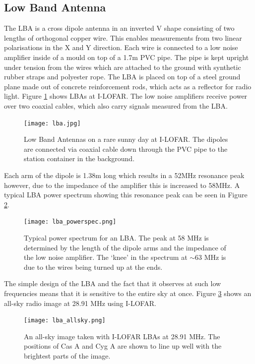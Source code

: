 \subsection{Low Band Antenna}
The LBA is a cross dipole antenna in an inverted V shape consisting of two lengths of orthogonal copper wire. This enables measurements from two linear polarisations in the X and Y direction. Each wire is connected to a low noise amplifier inside of a mould on top of a 1.7m PVC pipe. The pipe is kept upright under tension from the wires which are attached to the ground with synthetic rubber straps and polyester rope. The LBA is placed on top of a steel ground plane made out of concrete reinforcement rods, which acts as a reflector for radio light. Figure \ref{fig:LBA} shows LBAs at I-LOFAR. The low noise amplifiers receive power over two coaxial cables, which also carry signals measured from the LBA.

\begin{figure}
\centering
\texttt{[image: lba.jpg]}
\caption[Low Band Antennas at I-LOFAR]{Low Band Antennas on a rare sunny day at I-LOFAR. The dipoles are connected via coaxial cable down through the PVC pipe to the station container in the background.}
\label{fig:LBA}
\end{figure}

Each arm of the dipole is 1.38m long which results in a 52MHz resonance peak however, due to the impedance of the amplifier this is increased to 58MHz. A typical LBA power spectrum showing this resonance peak can be seen in Figure \ref{fig:LBA_power_spec}.

\begin{figure}
    \centering
    \texttt{[image: lba\_powerspec.png]}
    \caption[Typical power spectrum for an LBA.]{Typical power spectrum for an LBA. The peak at 58 MHz is determined by the length of the dipole arms and the impedance of the low noise amplifier. The `knee' in the spectrum at $\sim 63$ MHz is due to the wires being turned up at the ends.}
    \label{fig:LBA_power_spec}
\end{figure}

The simple design of the LBA and the fact that it observes at such low frequencies means that it is sensitive to the entire sky at once. Figure \ref{fig:LBA_allsky} shows an all-sky radio image at 28.91 MHz using I-LOFAR.

\begin{figure}
\centering
\texttt{[image: lba\_allsky.png]}
\caption[An all sky image taken with I-LOFAR LBAs.]{An all-sky image taken with I-LOFAR LBAs at 28.91 MHz. The positions of Cas A and Cyg A are shown to line up well with the brightest parts of the image.}
\label{fig:LBA_allsky}
\end{figure}

